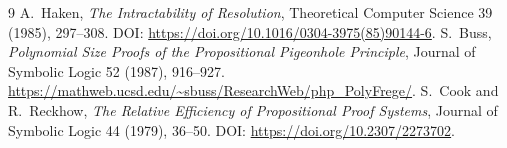 \documentclass[11pt]{article}
\begin{document}
\begin{thebibliography}{9}
 A.~Haken, \emph{The Intractability of Resolution}, Theoretical Computer Science 39 (1985), 297--308. DOI: \url{https://doi.org/10.1016/0304-3975(85)90144-6}.
 S.~Buss, \emph{Polynomial Size Proofs of the Propositional Pigeonhole Principle}, Journal of Symbolic Logic 52 (1987), 916--927. \url{https://mathweb.ucsd.edu/~sbuss/ResearchWeb/php_PolyFrege/}.
 S.~Cook and R.~Reckhow, \emph{The Relative Efficiency of Propositional Proof Systems}, Journal of Symbolic Logic 44 (1979), 36--50. DOI: \url{https://doi.org/10.2307/2273702}.
\end{thebibliography}
\end{document}
